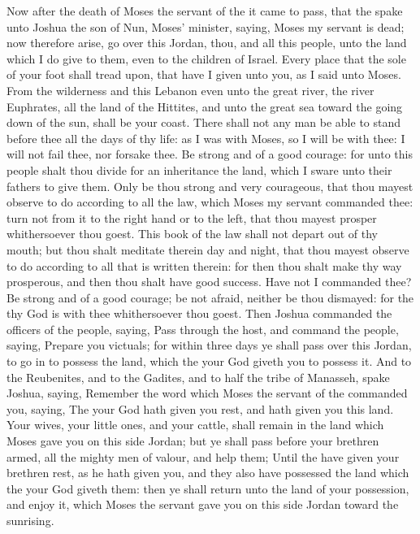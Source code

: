 
\begin{biblechapter} %
 Now after the death of Moses the servant of the \LORD it came to pass, that the \LORD spake unto Joshua the son of Nun, Moses' minister, saying,
\verse Moses my servant is dead; now therefore arise, go over this Jordan, thou, and all this people, unto the land which I do give to them, even to the children of Israel.
\verse Every place that the sole of your foot shall tread upon, that have I given unto you, as I said unto Moses.
\verse From the wilderness and this Lebanon even unto the great river, the river Euphrates, all the land of the Hittites, and unto the great sea toward the going down of the sun, shall be your coast.
\verse There shall not any man be able to stand before thee all the days of thy life: as I was with Moses, so I will be with thee: I will not fail thee, nor forsake thee.
\verse Be strong and of a good courage: for unto this people shalt thou divide for an inheritance the land, which I sware unto their fathers to give them.
\verse Only be thou strong and very courageous, that thou mayest observe to do according to all the law, which Moses my servant commanded thee: turn not from it to the right hand or to the left, that thou mayest prosper whithersoever thou goest.
\verse This book of the law shall not depart out of thy mouth; but thou shalt meditate therein day and night, that thou mayest observe to do according to all that is written therein: for then thou shalt make thy way prosperous, and then thou shalt have good success.
\verse Have not I commanded thee? Be strong and of a good courage; be not afraid, neither be thou dismayed: for the \LORD thy God is with thee whithersoever thou goest.
\verse Then Joshua commanded the officers of the people, saying,
\verse Pass through the host, and command the people, saying, Prepare you victuals; for within three days ye shall pass over this Jordan, to go in to possess the land, which the \LORD your God giveth you to possess it.
\verse And to the Reubenites, and to the Gadites, and to half the tribe of Manasseh, spake Joshua, saying,
\verse Remember the word which Moses the servant of the \LORD commanded you, saying, The \LORD your God hath given you rest, and hath given you this land.
\verse Your wives, your little ones, and your cattle, shall remain in the land which Moses gave you on this side Jordan; but ye shall pass before your brethren armed, all the mighty men of valour, and help them;
\verse Until the \LORD have given your brethren rest, as he hath given you, and they also have possessed the land which the \LORD your God giveth them: then ye shall return unto the land of your possession, and enjoy it, which Moses the \LORDs servant gave you on this side Jordan toward the sunrising.

\end{biblechapter}
